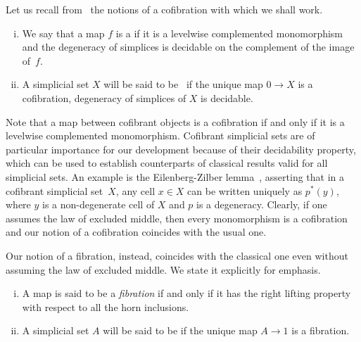 \documentclass[reqno,10pt,a4paper,oneside,draft]{amsart}
\begin{document}
\medskip



Let us recall from~\cite{henry2018wms} the notions of a cofibration with which we shall work. 


\begin{definition} \hfill
\begin{enumerate}[(i)] 
\item We say that  a map $f$ is a  if it is a levelwise complemented monomorphism and the degeneracy of simplices is decidable on the complement of the image of~$f$. 
\item A simplicial set $X$ will be said to be~ if the unique map $0 \to X$ is a cofibration, 
\ie degeneracy of simplices of $X$ is decidable.
\end{enumerate}
\end{definition}

\medskip


 Note that a map between cofibrant objects is a cofibration
if and only if it is a levelwise complemented monomorphism. 
Cofibrant simplicial sets are of particular importance for our development because of their decidability property, which can be used to establish counterparts of classical results valid for all simplicial sets. An example is the Eilenberg-Zilber lemma~\cite{henry2018wms}, asserting that in a cofibrant simplicial set~$X$, any cell $x \in X$ can be written uniquely as $p^*(y)$, where $y$ is a non-degenerate cell of $X$ and $p$ is a degeneracy. Clearly, if one assumes the law of excluded middle, then every monomorphism is a cofibration and our notion of a cofibration coincides with the usual one. 

\medskip

Our notion of a fibration, instead, coincides with the classical one even without assuming the law of excluded middle. We state it explicitly for emphasis.  


 

\begin{definition}  \hfill 
\begin{enumerate}[(i)] 
\item A map is said to be a \emph{fibration} if and only if it has the right lifting property with respect to all the horn inclusions. 
\item A simplicial set $A$ will be said to be  if the unique map $A \to 1$ is a fibration.
\end{enumerate}
\end{definition}
\end{document}
